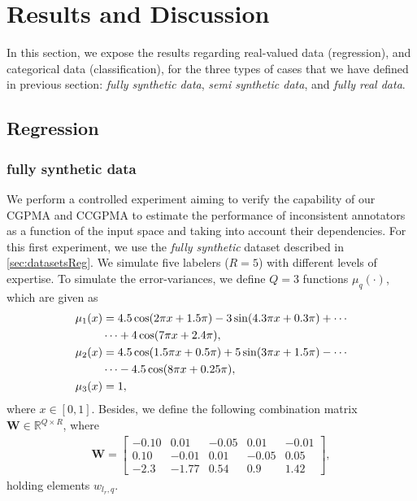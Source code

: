 \documentclass[journal]{IEEEtran}
\newcommand{\Real}{\mathbb{R}}
\newcommand{\boldW}{\mathbf{W}}
\begin{document}
\section{Results and Discussion}
In this section, we expose the results regarding real-valued data (regression), and categorical data (classification), for the three types of cases that we have defined in previous section: \textit{fully synthetic data}, \textit{semi synthetic data}, and \textit{fully real data}.

\subsection{Regression}
\subsubsection{fully synthetic data}
We perform a controlled experiment aiming to verify the capability of our CGPMA and CCGPMA to estimate the performance of inconsistent annotators as a function of the input space and taking into account their dependencies. For this first experiment, we use the \textit{fully synthetic} dataset described in \cref{sec:datasetsReg}. We simulate five labelers ($R=5$) with different levels of expertise. To simulate the error-variances, we define $Q=3$ functions $\mu_q(\cdot)$, which are given as 
\begin{align}
\label{eq:u1r}
\notag \mu_1(x) &= 4.5\cos(2\pi x + 1.5\pi) - 3\sin(4.3\pi x + 0.3\pi) +\cdots\\ & \cdots + 4\cos(7\pi x + 2.4\pi),\\
\label{eq:u2r}
\notag \mu_2(x) &= 4.5\cos(1.5\pi x + 0.5\pi) + 5\sin(3\pi x + 1.5\pi) - \cdots\\ & \cdots - 4.5\cos(8\pi x+ 0.25\pi),\\
\label{eq:u3r}
\mu_3(x) &= 1,
\end{align}
where $x\in [0,1]$. Besides, we define the following combination matrix $\boldW \in \Real^{Q\times R}$, where
\begin{align}
\boldW=\begin{bmatrix}
-0.10  &  0.01   & -0.05 &  0.01  & -0.01\\
0.10   &  -0.01  & 0.01  &  -0.05 & 0.05\\
-2.3   &  -1.77  & 0.54  &  0.9   & 1.42
\end{bmatrix},
\label{eq:parametersP}
\end{align}
holding elements $w_{l_r,q}$.
\end{document}
